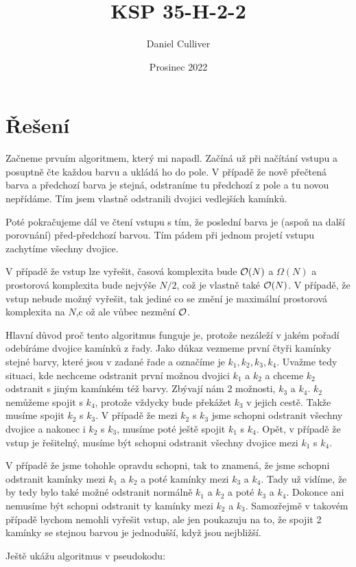 \documentclass{../../../ksp}
\title{KSP 35-H-2-2}
\author{Daniel Culliver}
\date{Prosinec 2022}
\begin{document}
\maketitle

\section*{Řešení}
Začneme prvním algoritmem, který mi napadl. Začíná už při načítání vstupu a posuptně čte každou barvu
a ukládá ho do pole. V případě že nově přečtená barva a předchozí barva je stejná, odstraníme tu předchozí z pole
a tu novou nepřídáme. Tím jsem vlastně odstranili dvojici vedlejších kamínků.

Poté pokračujeme dál ve čtení vstupu s tím, že poslední barva je (aspoň na další porovnání) před-předchozí barvou.
Tím pádem při jednom projetí vstupu zachytíme všechny dvojice.

V případě že vstup lze vyřešit, časová komplexita bude $\mathcal{O}(N)$ a $\Omega(N)$ a prostorová komplexita
bude nejvýše $N/2$, což je vlastně také $\mathcal{O}(N)$.
V případě, že vstup nebude možný vyřešit, tak jediné co se změní je maximální prostorová komplexita na $N$,c
ož ale vůbec nezmění $\mathcal{O}$.

Hlavní důvod proč tento algoritmus funguje je, protože nezáleží v jakém pořadí odebíráme dvojice kamínků z řady.
Jako důkaz vezmeme první čtyři kamínky stejné barvy, které jsou v zadané řade a označíme je $k_1, k_2, k_3, k_4$.
Uvažme tedy situaci, kde nechceme odstranit první možnou dvojici $k_1$ a $k_2$
a chceme $k_2$ odstranit s jiným kamínkém též barvy. Zbývají nám 2 možnosti, $k_3$ a $k_4$. $k_2$ nemůžeme spojit s $k_4$,
protože vždycky bude překážet $k_3$ v jejich cestě. Takže musíme spojit $k_2$ s $k_3$. V případě že mezi $k_2$ s $k_3$ jsme schopni
odstranit všechny dvojice a nakonec i $k_2$ s $k_3$, musíme poté ještě spojit $k_1$ s $k_4$. Opět, v případě že vstup je řešitelný,
musíme být schopni odstranit všechny dvojice mezi $k_1$ s $k_4$.

V případě že jsme tohohle opravdu schopni, tak to znamená,
že jsme schopni odstranit kamínky mezi $k_1$ a $k_2$ a poté kamínky mezi $k_3$ a $k_4$. Tady už vidíme, že by tedy bylo také možné
odstranit normálně $k_1$ a $k_2$ a poté $k_3$ a $k_4$. Dokonce ani nemusíme být schopni odstranit ty kamínky mezi
$k_2$ a $k_3$. Samozřejmě v takovém případě bychom nemohli vyřešit vstup, ale jen poukazuju na to, že spojit 2 kamínky se stejnou barvou
je jednodušší, když jsou nejbližší.

Ještě ukážu algoritmus v pseudokodu:
\end{document}
